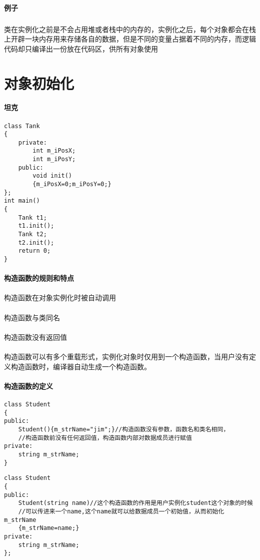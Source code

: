 \documentclass{article}
\begin{document}
\begin{CJK}{UTF8}{gbsn}
\paragraph{例子}
\subparagraph{}
类在实例化之前是不会占用堆或者栈中的内存的，实例化之后，每个对象都会在栈上开辟一块内存用来存储各自的数据，但是不同的变量占据着不同的内存，而逻辑代码却只编译出一份放在代码区，供所有对象使用
\section{对象初始化}
\paragraph{坦克}
\begin{verbatim}
class Tank
{
	private:
		int m_iPosX;
		int m_iPosY;
	public:
		void init()
		{m_iPosX=0;m_iPosY=0;}
};
int main()
{
	Tank t1;
	t1.init();
	Tank t2;
	t2.init();
	return 0;
}
\end{verbatim}
\paragraph{构造函数的规则和特点} 
\paragraph{}
构造函数在对象实例化时被自动调用
\paragraph{}
构造函数与类同名
\paragraph{}
构造函数没有返回值 
\paragraph{}
构造函数可以有多个重载形式，实例化对象时仅用到一个构造函数，当用户没有定义构造函数时，编译器自动生成一个构造函数。
\paragraph{构造函数的定义}
\begin{verbatim}
class Student
{
public:
	Student(){m_strName="jim";}//构造函数没有参数，函数名和类名相同，
	//构造函数前没有任何返回值，构造函数内部对数据成员进行赋值
private:
	string m_strName;
}
\end{verbatim}
\begin{verbatim}
class Student
{
public:
	Student(string name)//这个构造函数的作用是用户实例化student这个对象的时候
	//可以传进来一个name,这个name就可以给数据成员一个初始值，从而初始化m_strName
	{m_strName=name;}
private:
	string m_strName;
};
\end{verbatim}

\end{CJK}
\end{document}
